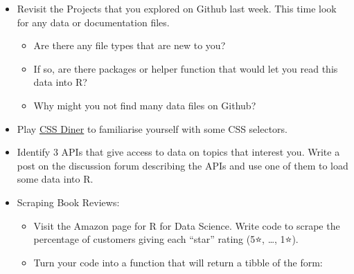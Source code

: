 \documentclass[
  letterpaper,
  DIV=11,
  numbers=noendperiod]{scrreprt}
\providecommand{\tightlist}{%
  \setlength{\itemsep}{0pt}\setlength{\parskip}{0pt}}\usepackage{longtable,booktabs,array}
\begin{document}
\begin{itemize}
\item
  Revisit the Projects that you explored on Github last week. This time
  look for any data or documentation files.

  \begin{itemize}
  \tightlist
  \item
    Are there any file types that are new to you?
  \item
    If so, are there packages or helper function that would let you read
    this data into R?
  \item
    Why might you not find many data files on Github?
  \end{itemize}
\item
  Play \href{https://flukeout.github.io/}{CSS Diner} to familiarise
  yourself with some CSS selectors.
\item
  Identify 3 APIs that give access to data on topics that interest you.
  Write a post on the discussion forum describing the APIs and use one
  of them to load some data into R.
\item
  Scraping Book Reviews:

  \begin{itemize}
  \tightlist
  \item
    Visit the Amazon page for R for Data Science. Write code to scrape
    the percentage of customers giving each ``star'' rating (5⭐,
    \ldots, 1⭐).
  \item
    Turn your code into a function that will return a tibble of the
    form:
  \end{itemize}
\end{itemize}
\end{document}
